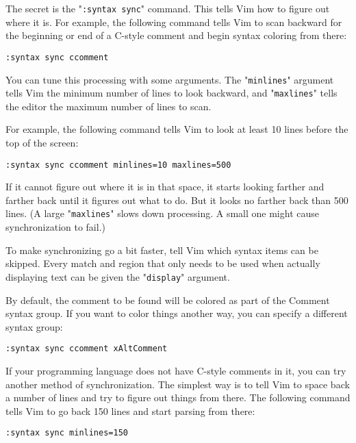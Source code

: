 The secret is the "\texttt{:syntax sync}" command.
This tells Vim how to figure out where it is.
For example, the following command tells Vim to scan backward for the beginning or end of a C-style comment and begin syntax coloring from there:

\begin{Verbatim}[samepage=true]
 :syntax sync ccomment
\end{Verbatim}

You can tune this processing with some arguments.
The "\texttt{minlines}" argument tells Vim the minimum number of lines to look backward, and "\texttt{maxlines}" tells the editor the maximum number of lines to scan.

For example, the following command tells Vim to look at least 10 lines before the top of the screen:

\begin{Verbatim}[samepage=true]
 :syntax sync ccomment minlines=10 maxlines=500
\end{Verbatim}

If it cannot figure out where it is in that space, it starts looking farther and farther back until it figures out what to do.
But it looks no farther back than 500 lines.
(A large "\texttt{maxlines}" slows down processing.
A small one might cause synchronization to fail.)

To make synchronizing go a bit faster, tell Vim which syntax items can be skipped.
Every match and region that only needs to be used when actually displaying text can be given the "\texttt{display}" argument.

By default, the comment to be found will be colored as part of the Comment syntax group.
If you want to color things another way, you can specify a different syntax group:

\begin{Verbatim}[samepage=true]
 :syntax sync ccomment xAltComment
\end{Verbatim}

If your programming language does not have C-style comments in it, you can try another method of synchronization.
The simplest way is to tell Vim to space back a number of lines and try to figure out things from there.
The following command tells Vim to go back 150 lines and start parsing from there:

\begin{Verbatim}[samepage=true]
 :syntax sync minlines=150
\end{Verbatim}

